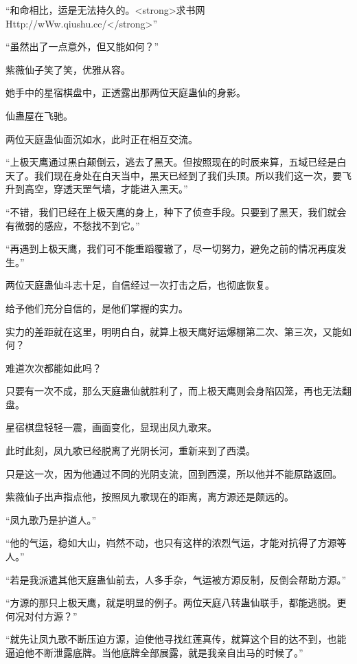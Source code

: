 
\begin{this_body}

“和命相比，运是无法持久的。<strong>求书网Http://wWw.qiushu.cc/</strong>”

“虽然出了一点意外，但又能如何？”

紫薇仙子笑了笑，优雅从容。

她手中的星宿棋盘中，正透露出那两位天庭蛊仙的身影。

仙蛊屋在飞驰。

两位天庭蛊仙面沉如水，此时正在相互交流。

“上极天鹰通过黑白颠倒云，逃去了黑天。但按照现在的时辰来算，五域已经是白天了。我们现在身处在白天当中，黑天已经到了我们头顶。所以我们这一次，要飞升到高空，穿透天罡气墙，才能进入黑天。”

“不错，我们已经在上极天鹰的身上，种下了侦查手段。只要到了黑天，我们就会有微弱的感应，不愁找不到它。”

“再遇到上极天鹰，我们可不能重蹈覆辙了，尽一切努力，避免之前的情况再度发生。”

两位天庭蛊仙斗志十足，自信经过一次打击之后，也彻底恢复。

给予他们充分自信的，是他们掌握的实力。

实力的差距就在这里，明明白白，就算上极天鹰好运爆棚第二次、第三次，又能如何？

难道次次都能如此吗？

只要有一次不成，那么天庭蛊仙就胜利了，而上极天鹰则会身陷囚笼，再也无法翻盘。

星宿棋盘轻轻一震，画面变化，显现出凤九歌来。

此时此刻，凤九歌已经脱离了光阴长河，重新来到了西漠。

只是这一次，因为他通过不同的光阴支流，回到西漠，所以他并不能原路返回。

紫薇仙子出声指点他，按照凤九歌现在的距离，离方源还是颇远的。

“凤九歌乃是护道人。”

“他的气运，稳如大山，岿然不动，也只有这样的浓烈气运，才能对抗得了方源等人。”

“若是我派遣其他天庭蛊仙前去，人多手杂，气运被方源反制，反倒会帮助方源。”

“方源的那只上极天鹰，就是明显的例子。两位天庭八转蛊仙联手，都能逃脱。更何况对付方源？”

“就先让凤九歌不断压迫方源，迫使他寻找红莲真传，就算这个目的达不到，也能逼迫他不断泄露底牌。当他底牌全部展露，就是我亲自出马的时候了。”


\end{this_body}
